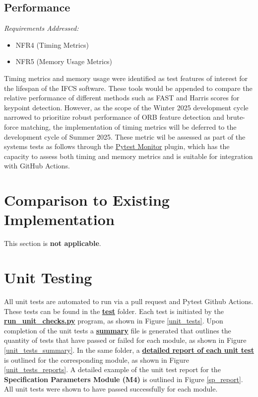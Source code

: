 \documentclass[12pt, titlepage]{article}
\begin{document}
\subsection{Performance}
\textit{Requirements Addressed:} 
\begin{itemize}
\item NFR4 (Timing Metrics)
\item NFR5 (Memory Usage Metrics)
\end{itemize}
Timing metrics and memory usage were identified as test features of interest for the lifespan of the IFCS software. These tools would be appended to compare the relative performance of different methods such as FAST and Harris scores for keypoint detection. However, as the scope of the Winter 2025 development cycle narrowed to prioritize robust performance of ORB feature detection and brute-force matching, the implementation of timing metrics will be deferred to the development cycle of Summer 2025. These metric wil be assessed as part of the systems tests as follows through the \href{https://pypi.org/project/pytest-monitor/}{Pytest Monitor} plugin, which has the capacity to assess both timing and memory metrics and is suitable for integration with GitHub Actions.


\section{Comparison to Existing Implementation}	
This section is \textbf{not applicable}.


\section{Unit Testing}\label{Sec_utest}
All unit tests are automated to run via a pull request and Pytest Github Actions. These tests can be found in the \href{https://github.com/KiranSingh15/CAS-741-Image-Correspondences/tree/main/test}{\textbf{test}} folder. Each test is initiated by the \href{https://github.com/KiranSingh15/CAS-741-Image-Correspondences/blob/main/test/run_unit_checks.py}{\textbf{run\_unit\_checks.py}} program, as shown in Figure \ref{unit_tests}. Upon completion of the unit tests a \href{https://github.com/KiranSingh15/CAS-741-Image-Correspondences/blob/main/test/results/UnitTests-60f8e10/2025-04-15_01-38-43/summary.txt}{\textbf{summary}} file is generated that outlines the quantity of tests that have passed or failed for each module, as shown in Figure \ref{unit_tests_summary}. In the same folder, a \href{https://github.com/KiranSingh15/CAS-741-Image-Correspondences/tree/main/test/results/UnitTests-60f8e10/2025-04-15_01-38-43}{\textbf{detailed report of each unit test}} is outlined for the corresponding module, as shown in Figure \ref{unit_tests_reports}. A detailed example of the unit test report for the \textbf{Specification Parameters Module (M4)} is outlined in Figure \ref{sp_report}. All unit tests were shown to have passed successfully for each module.
\end{document}
